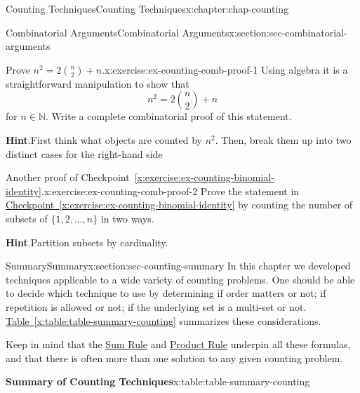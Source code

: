 \documentclass[oneside,10pt,]{book}
\newcommand{\blocktitlefont}{\relax}
\newcommand{\tabularfont}{\relax}
\newcommand{\xreffont}{\relax}
\numberwithin{equation}{section}
\begin{document}
\begin{chapterptx}{Counting Techniques}{}{Counting Techniques}{}{}{x:chapter:chap-counting}
\begin{sectionptx}{Combinatorial Arguments}{}{Combinatorial Arguments}{}{}{x:section:sec-combinatorial-arguments}
\begin{itemize}[label=\textbullet]
\end{itemize}
%
\begin{inlineexercise}{Prove \(n^2 = 2\binom{n}{2} + n\).}{x:exercise:ex-counting-comb-proof-1}%
Using algebra it is a straightforward manipulation to show that%
\begin{equation*}
n^2 = 2\binom{n}{2} + n
\end{equation*}
for \(n \in \mathbb{N}\). Write a complete combinatorial proof of this statement.%
\par\smallskip%
\noindent\textbf{\blocktitlefont Hint}.\hypertarget{g:hint:id475280}{}\quad{}First think what objects are counted by \(n^2\). Then, break them up into two distinct cases for the right-hand side%
\end{inlineexercise}
\begin{inlineexercise}{Another proof of Checkpoint~{\xreffont\ref*{x:exercise:ex-counting-binomial-identity}}.}{x:exercise:ex-counting-comb-proof-2}%
Prove the statement in \hyperref[x:exercise:ex-counting-binomial-identity]{Checkpoint~{\xreffont\ref{x:exercise:ex-counting-binomial-identity}}} by counting the number of subsets of \(\{1,2,\ldots,n\}\) in two ways.%
\par\smallskip%
\noindent\textbf{\blocktitlefont Hint}.\hypertarget{g:hint:id475317}{}\quad{}Partition subsets by cardinality.%
\end{inlineexercise}
\end{sectionptx}
%
%
\typeout{************************************************}
\typeout{************************************************}
%
\begin{sectionptx}{Summary}{}{Summary}{}{}{x:section:sec-counting-summary}
In this chapter we developed techniques applicable to a wide variety of counting problems. One should be able to decide which technique to use by determining if order matters or not; if repetition is allowed or not; if the underlying set is a multi-set or not. \hyperref[x:table:table-summary-counting]{Table~{\xreffont\ref{x:table:table-summary-counting}}} summarizes these considerations.%
\par
Keep in mind that the \hyperref[x:principle:prin-sum-rule]{Sum Rule} and \hyperref[x:principle:prin-prod-rule]{Product Rule} underpin all these formulas, and that there is often more than one solution to any given counting problem.%
\begin{tableptx}{\textbf{Summary of Counting Techniques}}{x:table:table-summary-counting}{}%
\centering
{\tabularfont%
\begin{tabular}{ccc}

\end{tabular}}
\end{tableptx}
\end{sectionptx}
\end{chapterptx}
\end{document}
